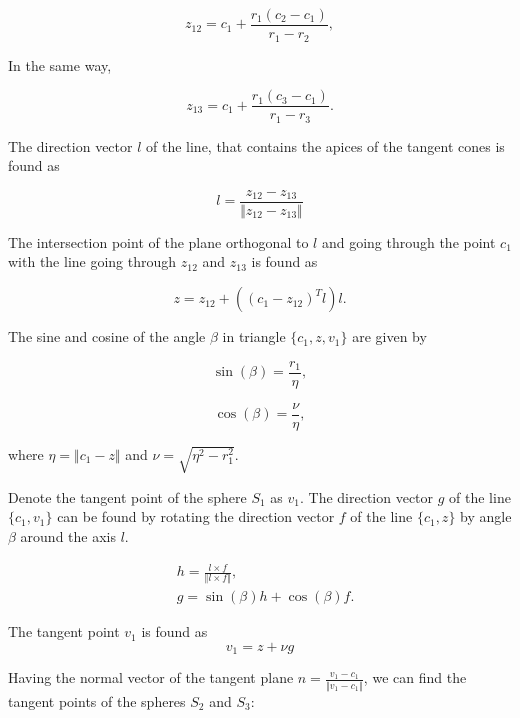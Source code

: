 \begin{equation}
	z_{12} = c_1 +\frac{r_1 (c_2 - c_1)}{r_1 - r_2},
\end{equation}

In the same way,

\begin{equation}
	z_{13} = c_1 +\frac{r_1 (c_3 - c_1)}{r_1 - r_3}.
\end{equation}

The direction vector $l$ of the line, that contains the apices of the tangent cones is found as

\begin{equation}
	l = \frac{z_{12} - z_{13}} {\Vert z_{12} - z_{13} \Vert} 
\end{equation}

The intersection point of the plane orthogonal to $l$ and going through the point $c_1$ with the line going through $z_{12}$ and $z_{13}$ is found as

\begin{equation}
z = z_{12} + ((c_1 - z_{12})^T l )l.
\end{equation}

The sine and cosine of the angle $\beta$ in triangle $\{c_1, z, v_1\}$ are given by 

\begin{equation}
	\sin(\beta) = \frac{r_1}{\eta},
\end{equation}

\begin{equation}
	\cos(\beta) = \frac{\nu}{\eta},
\end{equation}

where $\eta = \Vert c_1 - z \Vert $ and $\nu = \sqrt{\eta^2 -  r_1^2}$. 

Denote the tangent point of the sphere $S_1$ as $v_1$. The direction vector $g$ of the line $\{c_1, v_1\}$ can be found by rotating the direction vector $f$ of the line 
$\{c_1, z\}$ by angle $\beta$ around the axis $l$.

\begin{align}
	& h = \frac{l \times f}{\Vert l \times f \Vert}, \\
	& g = \sin(\beta) h + \cos(\beta) f.	
\end{align}

The tangent point $v_1$ is found as
\begin{equation}
v_1 = z + \nu  g
\end{equation}


Having the normal vector of the tangent plane $n = \frac{v_1 - c_1}{\Vert v_1 - c_1 \Vert}$, we can find the tangent points of the spheres $S_2$ and $S_3$:


